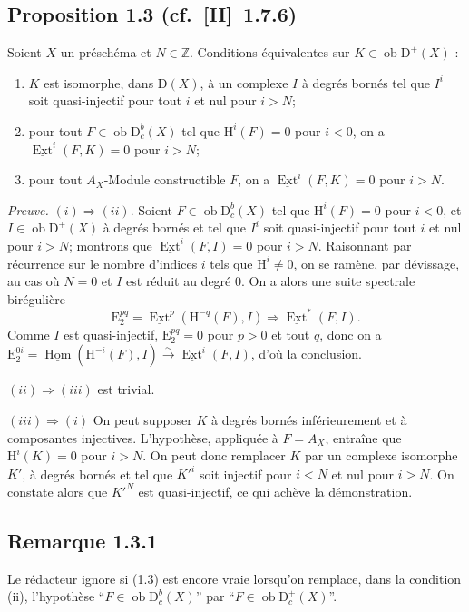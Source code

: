 \documentclass[11pt]{article}
\renewcommand{\H}{\mathrm{H}}
\DeclareMathOperator{\Hom}{Hom}
\DeclareMathOperator{\Ext}{Ext}
\newcommand{\D}{\mathrm{D}}
\newcommand{\Z}{\mathbb{Z}}
\newcommand{\E}{\mathrm{E}}
\newcommand{\ob}{\operatorname{ob}}
\providecommand{\Hom}{\operatorname{Hom}}
\providecommand{\ob}{\operatorname{ob}}
\providecommand{\Z}{\mathbb Z}
\providecommand{\Hom}{\operatorname{Hom}}
\begin{document}
\subsection*{Proposition 1.3 {\normalfont (cf.~[H]~1.7.6)}}
Soient $X$ un préschéma et $N \in \Z$. Conditions équivalentes sur $K \in \ob \D^{+}(X)$ :
\begin{enumerate}[label=(\roman*)]
\item $K$ est isomorphe, dans $\D(X)$, à un complexe $I$ à degrés bornés tel que $I^i$ soit quasi-injectif pour tout $i$ et nul pour $i > N$;
\item pour tout $F \in \ob \D_c^{b}(X)$ tel que $\H^i(F) = 0$ pour $i < 0$, on a $\underline{\Ext}^i(F,K) = 0$ pour $i > N$;
\item pour tout $A_X$-Module constructible $F$, on a $\underline{\Ext}^i(F,K) = 0$ pour $i > N$.
\end{enumerate}

\emph{Preuve.} $(i) \Rightarrow (ii)$. Soient $F \in \ob \D_c^{b}(X)$ tel que $\H^i(F) = 0$ pour $i < 0$, et $I \in \ob \D^{+}(X)$ à degrés bornés et tel que $I^i$ soit quasi-injectif pour tout $i$ et nul pour $i > N$; montrons que $\underline{\Ext}^i(F,I) = 0$ pour $i > N$. Raisonnant par récurrence sur le nombre d'indices $i$ tels que $\H^i \neq 0$, on se ramène, par dévissage, au cas où $N = 0$ et $I$ est réduit au degré $0$. On a alors une suite spectrale birégulière
\[
\E_2^{pq} = \underline{\Ext}^p(\H^{-q}(F),I) \Rightarrow \underline{\Ext}^{*}(F,I).
\]
Comme $I$ est quasi-injectif, $\E_2^{pq} = 0$ pour $p > 0$ et tout $q$, donc on a $\E_2^{0i} = \underline{\Hom}(\H^{-i}(F),I) \xrightarrow{\sim} \underline{\Ext}^i(F,I)$, d'où la conclusion.

$(ii) \Rightarrow (iii)$ est trivial.

$(iii) \Rightarrow (i)$ On peut supposer $K$ à degrés bornés inférieurement et à composantes injectives. L'hypothèse, appliquée à $F = A_X$, entraîne que $\H^i(K) = 0$ pour $i > N$. On peut donc remplacer $K$ par un complexe isomorphe $K'$, à degrés bornés et tel que $K'^i$ soit injectif pour $i < N$ et nul pour $i > N$. On constate alors que $K'^N$ est quasi-injectif, ce qui achève la démonstration.

\subsection*{Remarque 1.3.1}
Le rédacteur ignore si (1.3) est encore vraie lorsqu'on remplace, dans la condition (ii), l'hypothèse ``$F \in \ob \D_c^{b}(X)$'' par ``$F \in \ob \D_c^{+}(X)$''.
\end{document}
